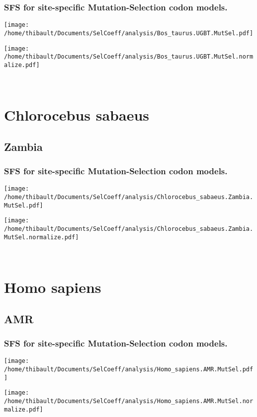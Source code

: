 \subsubsection*{SFS for site-specific Mutation-Selection codon models.} 
\begin{minipage}{0.49\linewidth} 
\texttt{[image: /home/thibault/Documents/SelCoeff/analysis/Bos\_taurus.UGBT.MutSel.pdf]} 
\end{minipage}
\begin{minipage}{0.49\linewidth}
\texttt{[image: /home/thibault/Documents/SelCoeff/analysis/Bos\_taurus.UGBT.MutSel.normalize.pdf]} 
\end{minipage}
\\ 
\section{Chlorocebus sabaeus} 
 
\subsection{Zambia} 
 
\subsubsection*{SFS for site-specific Mutation-Selection codon models.} 
\begin{minipage}{0.49\linewidth} 
\texttt{[image: /home/thibault/Documents/SelCoeff/analysis/Chlorocebus\_sabaeus.Zambia.MutSel.pdf]} 
\end{minipage}
\begin{minipage}{0.49\linewidth}
\texttt{[image: /home/thibault/Documents/SelCoeff/analysis/Chlorocebus\_sabaeus.Zambia.MutSel.normalize.pdf]} 
\end{minipage}
\\ 
\section{Homo sapiens} 
 
\subsection{AMR} 
 
\subsubsection*{SFS for site-specific Mutation-Selection codon models.} 
\begin{minipage}{0.49\linewidth} 
\texttt{[image: /home/thibault/Documents/SelCoeff/analysis/Homo\_sapiens.AMR.MutSel.pdf]} 
\end{minipage}
\begin{minipage}{0.49\linewidth}
\texttt{[image: /home/thibault/Documents/SelCoeff/analysis/Homo\_sapiens.AMR.MutSel.normalize.pdf]} 
\end{minipage}
\\ 
